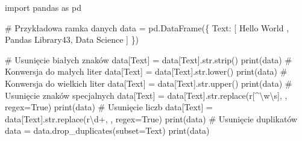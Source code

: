 \documentclass[
  polish,
  letterpaper,
  DIV=11,
  numbers=noendperiod]{scrreprt}
\newenvironment{Shaded}{\begin{snugshade}}{\end{snugshade}}
\newcommand{\BuiltInTok}[1]{\textcolor[rgb]{0.00,0.23,0.31}{#1}}
\newcommand{\CommentTok}[1]{\textcolor[rgb]{0.37,0.37,0.37}{#1}}
\newcommand{\DecValTok}[1]{\textcolor[rgb]{0.68,0.00,0.00}{#1}}
\newcommand{\ImportTok}[1]{\textcolor[rgb]{0.00,0.46,0.62}{#1}}
\newcommand{\NormalTok}[1]{\textcolor[rgb]{0.00,0.23,0.31}{#1}}
\newcommand{\OperatorTok}[1]{\textcolor[rgb]{0.37,0.37,0.37}{#1}}
\newcommand{\PreprocessorTok}[1]{\textcolor[rgb]{0.68,0.00,0.00}{#1}}
\newcommand{\StringTok}[1]{\textcolor[rgb]{0.13,0.47,0.30}{#1}}
\newcommand{\VariableTok}[1]{\textcolor[rgb]{0.07,0.07,0.07}{#1}}
\newcommand{\VerbatimStringTok}[1]{\textcolor[rgb]{0.13,0.47,0.30}{#1}}
\begin{document}
\begin{Shaded}
\begin{Highlighting}[]
\ImportTok{import}\NormalTok{ pandas }\ImportTok{as}\NormalTok{ pd}

\CommentTok{\# Przykładowa ramka danych}
\NormalTok{data }\OperatorTok{=}\NormalTok{ pd.DataFrame(\{}
    \StringTok{\textquotesingle{}Text\textquotesingle{}}\NormalTok{: [}\StringTok{\textquotesingle{}  Hello World  \textquotesingle{}}\NormalTok{, }\StringTok{\textquotesingle{}Pandas  Library43\textquotesingle{}}\NormalTok{, }\StringTok{\textquotesingle{}   Data   Science  \textquotesingle{}}\NormalTok{]}
\NormalTok{\})}

\CommentTok{\# Usunięcie białych znaków}
\NormalTok{data[}\StringTok{\textquotesingle{}Text\textquotesingle{}}\NormalTok{] }\OperatorTok{=}\NormalTok{ data[}\StringTok{\textquotesingle{}Text\textquotesingle{}}\NormalTok{].}\BuiltInTok{str}\NormalTok{.strip()}
\BuiltInTok{print}\NormalTok{(data)}
\CommentTok{\# Konwersja do małych liter}
\NormalTok{data[}\StringTok{\textquotesingle{}Text\textquotesingle{}}\NormalTok{] }\OperatorTok{=}\NormalTok{ data[}\StringTok{\textquotesingle{}Text\textquotesingle{}}\NormalTok{].}\BuiltInTok{str}\NormalTok{.lower()}
\BuiltInTok{print}\NormalTok{(data)}
\CommentTok{\# Konwersja do wielkich liter}
\NormalTok{data[}\StringTok{\textquotesingle{}Text\textquotesingle{}}\NormalTok{] }\OperatorTok{=}\NormalTok{ data[}\StringTok{\textquotesingle{}Text\textquotesingle{}}\NormalTok{].}\BuiltInTok{str}\NormalTok{.upper()}
\BuiltInTok{print}\NormalTok{(data)}
\CommentTok{\# Usunięcie znaków specjalnych}
\NormalTok{data[}\StringTok{\textquotesingle{}Text\textquotesingle{}}\NormalTok{] }\OperatorTok{=}\NormalTok{ data[}\StringTok{\textquotesingle{}Text\textquotesingle{}}\NormalTok{].}\BuiltInTok{str}\NormalTok{.replace(}\VerbatimStringTok{r\textquotesingle{}}\PreprocessorTok{[\^{}}\DecValTok{\textbackslash{}w\textbackslash{}s}\PreprocessorTok{]}\VerbatimStringTok{\textquotesingle{}}\NormalTok{, }\StringTok{\textquotesingle{}\textquotesingle{}}\NormalTok{, regex}\OperatorTok{=}\VariableTok{True}\NormalTok{)}
\BuiltInTok{print}\NormalTok{(data)}
\CommentTok{\# Usunięcie liczb}
\NormalTok{data[}\StringTok{\textquotesingle{}Text\textquotesingle{}}\NormalTok{] }\OperatorTok{=}\NormalTok{ data[}\StringTok{\textquotesingle{}Text\textquotesingle{}}\NormalTok{].}\BuiltInTok{str}\NormalTok{.replace(}\VerbatimStringTok{r\textquotesingle{}}\DecValTok{\textbackslash{}d}\OperatorTok{+}\VerbatimStringTok{\textquotesingle{}}\NormalTok{, }\StringTok{\textquotesingle{}\textquotesingle{}}\NormalTok{, regex}\OperatorTok{=}\VariableTok{True}\NormalTok{)}
\BuiltInTok{print}\NormalTok{(data)}
\CommentTok{\# Usunięcie duplikatów}
\NormalTok{data }\OperatorTok{=}\NormalTok{ data.drop\_duplicates(subset}\OperatorTok{=}\StringTok{\textquotesingle{}Text\textquotesingle{}}\NormalTok{)}
\BuiltInTok{print}\NormalTok{(data)}
\end{Highlighting}
\end{Shaded}
\end{document}

